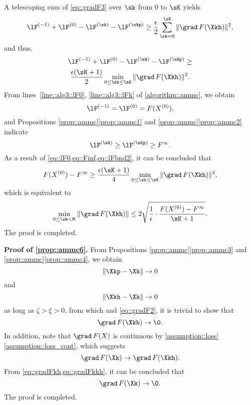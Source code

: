 A telescoping sum of \cref{eq::gradF3} over $\sk$ from $0$ to $\sK$ yields
\begin{equation}
	\nonumber
	\lF^{(-1)} + \lF^{(0)} - \lF^{(\sk)}-\lF^{(\skp)}\geq \\
	\frac{\epsilon}{2} \sum_{\sk=0}^{\sK}\|\grad\,F(\Xkh)\|^2,
\end{equation}
and thus,
\begin{multline}\label{eq::lFbnd2}
	\lF^{(-1)} + \lF^{(0)} - \lF^{(\sk)}-\lF^{(\skp)}\geq \\
	\frac{\epsilon(\sK+1)}{2}\min_{0\leq\sk\leq\sK}\|\grad\, F(\Xkh)\|^2.
\end{multline}
From lines~\ref{line::alg3::lF0}, \ref{line::alg3::lFk} of \cref{algorithm::ammc}, we obtain
\begin{equation}\label{eq::lF0}
	\lF^{(-1)}=\lF^{(0)}=F(X^{(0)}),
\end{equation} 
and Propositions \ref{prop::ammc}\ref{prop::ammc1} and \ref{prop::ammc}\ref{prop::ammc2} indicate
\begin{equation}\label{eq::Finf}
	\lF^{(\sk)}\geq \lF^{(\skp)}\geq F^{\infty}.
\end{equation}
As a result of \cref{eq::lF0,eq::Finf,eq::lFbnd2}, it can be concluded that
\begin{multline}
	\nonumber
	F(X^{(0)})-F^\infty \geq \frac{\epsilon(\sK+1)}{4}\min_{0\leq\sk\leq\sK}\|\grad\, F(\Xkh)\|^2,
\end{multline}
which is equivalent to
\begin{equation}
	\min\limits_{0\leq\sk< \mathsf{K}}\|\grad\, F(\Xkh)\|\leq 2\sqrt{\frac{1}{\epsilon}\cdot\dfrac{F(X^{(0)})-F^\infty}{{\sK+1}}}.
\end{equation}
The proof is completed.


\vspace{0.5em}
\noindent\textbf{Proof of \ref{prop::ammc6}.\;} From Propositions \ref{prop::ammc}\ref{prop::ammc3} and \ref{prop::ammc}\ref{prop::ammc4}, we obtain
\begin{equation}
	\nonumber
	\|\Xkp-\Xk\|\rightarrow 0
\end{equation}
and
\begin{equation}
	\nonumber
	\|\Xkh-\Xk\|\rightarrow 0
\end{equation}
as long as $\zeta>\xi>0$, from which and \cref{eq::gradF2}, it is trivial to show that
\begin{equation}\label{eq::gradFkh}
	\grad\, F(\Xkh)\rightarrow \0.
\end{equation}
In addition, note that $\grad\,F(X)$ is continuous by \cref{assumption::loss}\ref{assumption::loss_cont}, which suggests
\begin{equation}\label{eq::gradFkkh}
	\grad\,F(\Xk)\rightarrow\grad\,F(\Xkh).
\end{equation}
From \cref{eq::gradFkh,eq::gradFkkh}, it can be concluded that
\begin{equation}
	\nonumber
	\grad\, F(\Xk) \rightarrow \0.
\end{equation}
The proof is completed.

